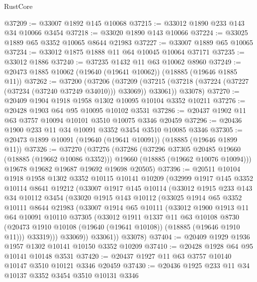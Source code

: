 \begin{lexlean}{RustCore}
\begin{coremodule}
@37209 := @33007 @1892 @145 @10068
@37215 := @33012 @1890 @233 @143 @34 @10066 @3454
@37218 := @33020 @1890 @143 @10066
@37224 := @33025 @1889 @65 @3352 @10065 @8644 @21983
@37227 := @33007 @1889 @65 @10065
@37234 := @33012 @1875 @1888 @11 @64 @10045 @10064 @37171
@37235 := @33012 @1886
@37240 := @37235 @1432 @11 @63 @10062 @8960
@37249 := @20473 @1885 @10062 (@19640 (@19641 @10062)) (@18885 (@19646 @1885 @11))
@37262 := @37200
    (@37206
      (@37209 (@37215 (@37218 (@37224 (@37227 (@37234 (@37240 @37249 @34010))) @33069)) @33061))
      @33078)
@37270 := @20409 @1904 @1918 @1958 @1302 @10095 @10104 @3352 @10211
@37276 := @20428 @1903 @64 @95 @10095 @10102 @3531
@37286 := @20437 @1902 @11 @63 @3757 @10094 @10101 @3510 @10075 @3346 @20459
@37296 := @20436 @1900 @233 @11 @34 @10091 @3352 @3454 @3510 @10085 @3346
@37305 := @20473 @1899 @10091 (@19640 (@19641 @10091)) (@18885 (@19646 @1899 @11))
@37326 := @37270
    (@37276
      (@37286
        (@37296 @37305 @20485 @19660 (@18885 (@19662 @10086 @3352)))
        @19660
        (@18885 (@19662 @10076 @10094)))
      @19678
      @19682
      @19687
      @19692
      @19698
      @20505)
@37396 := @20511
    @10104
    @1918
    @1958
    @1302
    @3352
    @10115
    @10141
    @10209
    (@32999
      @1917
      @145
      @3352
      @10114
      @8641
      @19212
      (@33007
        @1917
        @145
        @10114
        (@33012
          @1915
          @233
          @143
          @34
          @10112
          @3454
          (@33020
            @1915
            @143
            @10112
            (@33025
              @1914
              @65
              @3352
              @10111
              @8644
              @21983
              (@33007
                @1914
                @65
                @10111
                (@33012
                  @1900
                  @1913
                  @11
                  @64
                  @10091
                  @10110
                  @37305
                  (@33012
                    @1911
                    @1337
                    @11
                    @63
                    @10108
                    @8730
                    (@20473 @1910 @10108 (@19640 (@19641 @10108)) (@18885 (@19646 @1910 @11)))
                    @33319)))
              @33069))
          @33061))
      @33078)
@37404 := @20409 @1929 @1936 @1957 @1302 @10141 @10150 @3352 @10209
@37410 := @20428 @1928 @64 @95 @10141 @10148 @3531
@37420 := @20437 @1927 @11 @63 @3757 @10140 @10147 @3510 @10121 @3346 @20459
@37430 := @20436 @1925 @233 @11 @34 @10137 @3352 @3454 @3510 @10131 @3346

\end{coremodule}
\end{lexlean}

